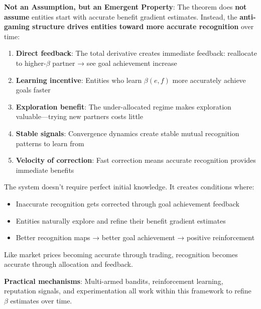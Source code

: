 \documentclass[11pt,a4paper]{article}
\theoremstyle{definition}
\theoremstyle{remark}
\begin{document}
\textbf{Not an Assumption, but an Emergent Property}: The theorem does \textbf{not assume} entities start with accurate benefit gradient estimates. Instead, the \textbf{anti-gaming structure drives entities toward more accurate recognition} over time:

\begin{enumerate}
\item \textbf{Direct feedback}: The total derivative creates immediate feedback: reallocate to higher-$\beta$ partner → see goal achievement increase
\item \textbf{Learning incentive}: Entities who learn $\beta(e,f)$ more accurately achieve goals faster
\item \textbf{Exploration benefit}: The under-allocated regime makes exploration valuable---trying new partners costs little
\item \textbf{Stable signals}: Convergence dynamics create stable mutual recognition patterns to learn from
\item \textbf{Velocity of correction}: Fast correction means accurate recognition provides immediate benefits
\end{enumerate}

The system doesn't require perfect initial knowledge. It creates conditions where:
\begin{itemize}
\item Inaccurate recognition gets corrected through goal achievement feedback
\item Entities naturally explore and refine their benefit gradient estimates
\item Better recognition maps → better goal achievement → positive reinforcement
\end{itemize}

Like market prices becoming accurate through trading, recognition becomes accurate through allocation and feedback.

\textbf{Practical mechanisms}: Multi-armed bandits, reinforcement learning, reputation signals, and experimentation all work within this framework to refine $\beta$ estimates over time.
\end{document}
